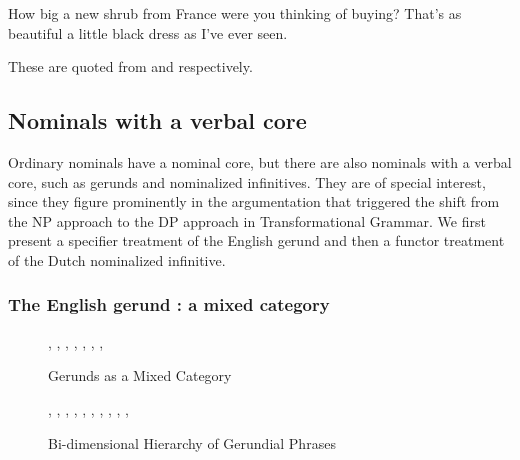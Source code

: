 \documentclass[output=paper]{langsci/langscibook}
\begin{document}
\begin{exe} 
\ex\label{shrub} 
\begin{xlist} 
\ex  How big a new shrub from France were you thinking of buying? 
\ex  That's as beautiful a little black dress as I've ever seen.  
\end{xlist} 
\end{exe} 

\noindent
These are quoted from \citet[116]{Zwicky95} and \citet[42]{Troseth09} respectively. 


\subsection{Nominals with a verbal core} 


Ordinary nominals have a nominal core, but there are also nominals  
with a verbal core, such as gerunds and nominalized infinitives. They are 
of special interest, since they figure prominently in the argumentation 
that triggered the shift from the NP approach to the DP approach in Transformational 
Grammar. We first present a specifier treatment of the English gerund and then 
a functor treatment of the Dutch nominalized infinitive. 


\subsubsection{The English gerund : a mixed category} 


\begin{figure}
\begin{center}
\footnotesize
\tree
{,
  {,  
    {},
    {}, 
    {}},
  {,
    {},      
    {}}}
\caption{ \label{ger} Gerunds as a Mixed Category }
\normalsize
\end{center} 
\end{figure}   

\begin{figure}
\begin{center}
\footnotesize
\tree
    {,
      {, 
        {,
          {,
            {}}, 
          {,
            {}}, 
          {}}},
     {, 
        {},
        {}}}
\caption{\label{bido} Bi-dimensional Hierarchy of Gerundial Phrases } 
\normalsize
\end{center}
\end{figure}
\end{document}
